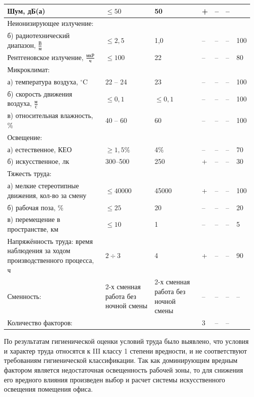 {\begin{longtable}[c]{|p{7cm}|p{2cm}|p{2cm}|p{0.5cm}|p{0.5cm}|p{0.5cm}|p{2cm}|}
    Шум, дБ(а)& \(\le 50\) & 50 & + & -- & -- & \\
    \hline
    Неионизирующее излучение: & & & & & & \\
    б) радиотехнический диапазон, \(\frac{\text{В}}{\text{м}}\) & \(\le 2,5\) & 1,0 & -- & -- & -- & 100 \\
    \hline
    Рентгеновское излучение, \(\frac{\text{мкР}}{\text{ч}}\)    & \(\le 100\) & 22          & -- & -- & -- & 80 \\
    \hline
    Микроклимат:                                                  &             &             &     &     &     &     \\
    а) температура воздуха, \(^{\circ}\mathrm{C}\)                & 22 -- 24    & 23          & --  & --  & --  & 100 \\
    б) скорость движения воздуха, \(\frac{\text{м}}{\text{с}}\)   & \(\le 0,1\) & \(\le 0,1\) & --  & --  & --  & 100 \\
    в) относительная влажность, \%                                & 40 -- 60    & 60          & --  & --  & --  & 100 \\
    \hline
    Освещение:            &               &     &     &     &     &    \\
    а) естественное, КЕО  & \(\ge 1,5\%\) & 4\% & --  & --  & --  & 70 \\
    б) искусственное, лк  & 300--500      & 250 &  +  & --  & --  & 30 \\
    \hline
    Тяжесть труда:         &               &     &     &     &     &    \\
    а) мелкие стереотипные
       движения, кол-во за
       смену                          & \(\le 40000\) & 45000 & +   & -- & -- & 100 \\
    б) рабочая поза, \%               & \(\le 25\)    & 20    & --  & -- & -- & 20  \\
    в) перемещение в пространстве, км & \(\le 10\)    & 1     & --  & -- & -- & 5   \\
    \hline
    Напряжённость труда: время наблюдения
    за ходом производственного процесса, ч & \(2 \div 3\) & 4 & + & -- & -- & 90 \\
    \hline
    Сменность: & 2-х сменная работа без ночной смены & 2-х сменная работа без ночной смены & -- & -- & -- & -- \\
    \hline
    Количество факторов: &  &  & 3 & -- & -- & \\
    \hline
\end{longtable}
}
По результатам гигиенической оценки условий труда было выявлено, что условия и характер труда относятся
к III классу 1 степени вредности, и не соответствуют требованиям гигиенической классификации.
Так как доминирующим вредным фактором является недостаточная освещенность рабочей зоны, то для снижения
его вредного влияния произведен выбор и расчет системы искусственного освещения помещения офиса. 

